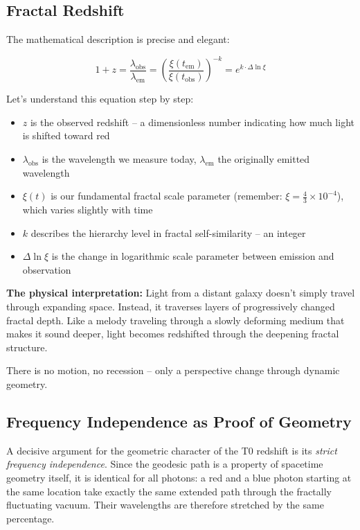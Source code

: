 \subsection{Fractal Redshift}

The mathematical description is precise and elegant:

\begin{equation}
1 + z = \frac{\lambda_{\text{obs}}}{\lambda_{\text{em}}} = \left(\frac{\xi(t_{\text{em}})}{\xi(t_{\text{obs}})}\right)^{-k} = e^{k \cdot \Delta \ln \xi}
\end{equation}

Let's understand this equation step by step:

\begin{itemize}[leftmargin=*]
\item $z$ is the observed redshift -- a dimensionless number indicating how much light is shifted toward red
\item $\lambda_{\text{obs}}$ is the wavelength we measure today, $\lambda_{\text{em}}$ the originally emitted wavelength
\item $\xi(t)$ is our fundamental fractal scale parameter (remember: $\xi = \frac{4}{3} \times 10^{-4}$), which varies slightly with time
\item $k$ describes the hierarchy level in fractal self-similarity -- an integer
\item $\Delta \ln \xi$ is the change in logarithmic scale parameter between emission and observation
\end{itemize}

\textbf{The physical interpretation:} Light from a distant galaxy doesn't simply travel through expanding space. Instead, it traverses layers of progressively changed fractal depth. Like a melody traveling through a slowly deforming medium that makes it sound deeper, light becomes redshifted through the deepening fractal structure.

There is no motion, no recession -- only a perspective change through dynamic geometry.

\subsection{Frequency Independence as Proof of Geometry}

A decisive argument for the geometric character of the T0 redshift is its \textit{strict frequency independence}. Since the geodesic path is a property of spacetime geometry itself, it is identical for all photons: a red and a blue photon starting at the same location take exactly the same extended path through the fractally fluctuating vacuum. Their wavelengths are therefore stretched by the same percentage.

